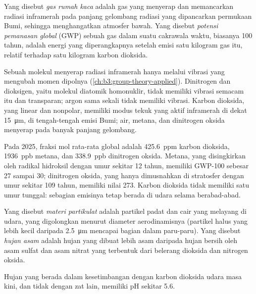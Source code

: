 \begin{definition}\label{def:b3:environmental-toxicology:greenhouse}
Yang disebut \emph{gas rumah kaca} adalah gas yang menyerap dan memancarkan radiasi
inframerah pada panjang gelombang radiasi yang dipancarkan permukaan Bumi, sehingga
menghangatkan atmosfer bawah. Yang disebut \emph{potensi pemanasan
global} (GWP) sebuah gas dalam suatu cakrawala waktu,
biasanya 100 tahun, adalah energi yang diperangkapnya setelah emisi satu kilogram gas itu,
relatif terhadap satu kilogram karbon dioksida.
\end{definition}

Sebuah molekul menyerap radiasi inframerah hanya melalui vibrasi yang mengubah
momen dipolnya (\cref{ch:b3:group-theory-applied}). Dinitrogen dan dioksigen,
yaitu molekul diatomik homonuklir, tidak memiliki vibrasi semacam itu dan transparan; argon sama sekali tidak memiliki
vibrasi. Karbon dioksida, yang linear dan nonpolar, memiliki modus tekuk yang aktif inframerah
di dekat \qty{15}{\micro\metre}, di tengah-tengah emisi Bumi; air, metana,
dan dinitrogen oksida menyerap pada banyak panjang gelombang.

Pada 2025, fraksi mol rata-rata global adalah \qty{425.6}{ppm} karbon dioksida, \qty{1936}{ppb}
metana, dan \qty{338.9}{ppb} dinitrogen oksida. Metana, yang disingkirkan oleh radikal hidroksil dengan
umur sekitar 12 tahun, memiliki GWP-100 sebesar 27 sampai 30; dinitrogen oksida, yang hanya dimusnahkan di
stratosfer dengan umur sekitar 109 tahun, memiliki nilai 273. Karbon dioksida tidak memiliki
satu umur tunggal: sebagian emisinya tetap berada di udara selama berabad-abad.

\begin{definition}\label{def:b3:environmental-toxicology:pollutants}
Yang disebut \emph{materi partikulat} adalah partikel padat dan cair
yang melayang di udara, yang digolongkan menurut diameter aerodinamisnya (partikel halus
yang lebih kecil daripada \qty{2.5}{\micro\metre} mencapai bagian dalam paru-paru). Yang disebut \emph{hujan
asam} adalah hujan yang dibuat lebih asam daripada hujan bersih oleh asam sulfat dan
asam nitrat yang terbentuk dari belerang dioksida dan nitrogen oksida.
\end{definition}

\begin{proposition}\label{prop:b3:environmental-toxicology:rain-ph}
Hujan yang berada dalam kesetimbangan dengan karbon dioksida udara masa kini, dan tidak dengan zat
lain, memiliki pH sekitar 5.6.
\end{proposition}

